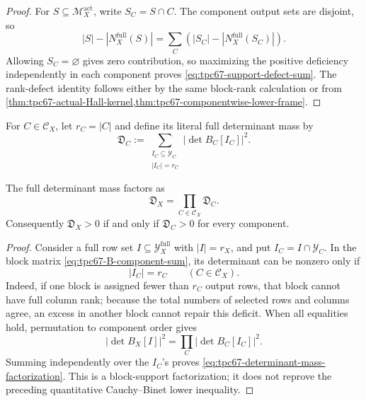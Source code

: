 \begin{proof}
For \(S\subseteq\mathcal M_X^{\mathrm{act}}\), write
\(S_C=S\cap C\).  The component output sets are disjoint, so
\[
 |S|-|N_X^{\mathrm{full}}(S)|
 =
 \sum_C
 \left(
 |S_C|-|N_X^{\mathrm{full}}(S_C)|
 \right).
\]
Allowing \(S_C=\varnothing\) gives zero contribution, so maximizing the
positive deficiency independently in each component proves
\eqref{eq:tpc67-support-defect-sum}.  The rank-defect identity follows either
by the same block-rank calculation or from
\cref{thm:tpc67-actual-Hall-kernel,thm:tpc67-componentwise-lower-frame}.
\end{proof}

For \(C\in\mathscr C_X\), let \(r_C=|C|\) and define its literal full
determinant mass by
\begin{equation}
 \mathfrak D_C
 :=
 \sum_{\substack{I_C\subseteq\mathcal Y_C\\|I_C|=r_C}}
 |\det B_C[I_C]|^2.
 \label{eq:tpc67-component-determinant-mass}
\end{equation}

\begin{proposition}
\label{prop:tpc67-determinant-mass-product}
The full determinant mass factors as
\begin{equation}
 \boxed{
 \mathfrak D_X
 =
 \prod_{C\in\mathscr C_X}\mathfrak D_C.}
 \label{eq:tpc67-determinant-mass-factorization}
\end{equation}
Consequently \(\mathfrak D_X>0\) if and only if
\(\mathfrak D_C>0\) for every component.
\end{proposition}

\begin{proof}
Consider a full row set
\(I\subseteq\mathcal Y_X^{\mathrm{full}}\) with \(|I|=r_X\), and put
\(I_C=I\cap\mathcal Y_C\).  In the block matrix
\eqref{eq:tpc67-B-component-sum}, its determinant can be nonzero only if
\[
 |I_C|=r_C
 \qquad(C\in\mathscr C_X).
\]
Indeed, if one block is assigned fewer than \(r_C\) output rows, that
block cannot have full column rank; because the total numbers of selected
rows and columns agree, an excess in another block cannot repair this
deficit.  When all equalities hold, permutation to component order gives
\[
 |\det B_X[I]|^2
 =
 \prod_C|\det B_C[I_C]|^2.
\]
Summing independently over the \(I_C\)'s proves
\eqref{eq:tpc67-determinant-mass-factorization}.  This is a block-support
factorization; it does not reprove the preceding quantitative
Cauchy--Binet lower inequality.
\end{proof}

